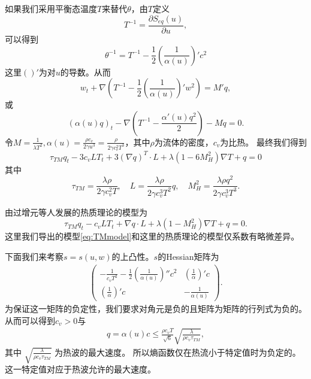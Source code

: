 如果我们采用平衡态温度$T$来替代$\theta$，由$T$定义
\begin{equation*}
	T^{-1}=\frac{\partial S_{eq}(u)}{\partial u},
\end{equation*}
可以得到
\begin{equation*}
\theta^{-1}=T^{-1}-\frac{1}{2}(\frac{1}{\alpha(u)})'{c}^2
\end{equation*}
这里$()'$为对$u$的导数。从而
\begin{equation*}
{w}_t+\nabla(T^{-1}-\frac{1}{2}(\frac{1}{\alpha(u)})' {w}^2)=M'{q},
\end{equation*}
或
\begin{equation*}
({\alpha(u)}{{q}})_t-\nabla(T^{-1}- \frac{\alpha'(u){q}^2}{2})-M{q}=0.
\end{equation*}
令$M=\frac{1}{\lambda T^2}, \alpha(u)=\frac{\rho c_v}{2\gamma u^3}=\frac{\rho}{2\gamma c_v^2 T^3}$，其中$\rho$为流体的密度，$c_v$为比热。
最终我们得到
\begin{equation}\label{eq:TMmodel}
\tau_{TM} {q}_t-3c_v {L}T_t+3(\nabla {q})^T \cdot {L}+\lambda(1-6M_H^2)\nabla T+{q}=0
\end{equation}
其中
\begin{equation*}
\tau_{TM}=\frac{\lambda \rho}{2 \gamma c_v^2 T}, \quad {L}=\frac{\lambda \rho}{2 \gamma c_v^3 T^2}{q}, \quad M_H^2=\frac{\lambda \rho {q}^2}{2\gamma c_v^3 T^3}.
\end{equation*}

由过增元等人发展的热质理论的模型为\cite{dong2011generalized,zeng2006motion,sellitto2013entropy}
\begin{equation*}
\tau_{TM} {q}_t-c_v {L}T_t+\nabla {q} \cdot {L}+\lambda(1-M_H^2)\nabla T+{q}=0.
\end{equation*}
这里我们导出的模型\eqref{eq:TMmodel}和这里的热质理论的模型仅系数有略微差异。

下面我们来考察$s=s(u,w)$的上凸性。$s$的Hessian矩阵为
\begin{eqnarray*}
\left( \begin{array}{ll} -\frac{1}{c_v T^2}-\frac{1}{2}(\frac{1}{\alpha(u)})'' {c}^2 & (\frac{1}{\alpha})'{c} \\ (\frac{1}{\alpha})'{c} & -\frac{1}{\alpha(u)} \end{array} \right).
\end{eqnarray*}
为保证这一矩阵的负定性，我们要求对角元是负的且矩阵为矩阵的行列式为负的。从而可以得到$c_v >0$与
\begin{eqnarray*}
{q}=\alpha(u){c} \le \frac{\rho c_v T}{\sqrt{6}} \sqrt{\frac{\lambda}{\rho c_v \tau_{TM}}},
\end{eqnarray*}
其中 $\sqrt{\frac{\lambda}{\rho c_v \tau_{TM}}}$ 为热波的最大速度\cite{jou1996extended}。 所以熵函数仅在热流小于特定值时为负定的。这一特定值对应于热波允许的最大速度。

